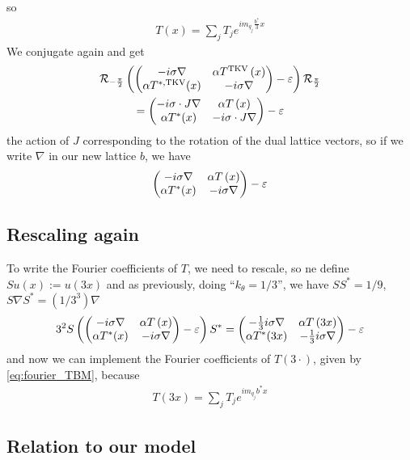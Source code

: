 \documentclass[11pt,a4paper,reqno,french,tikz]{amsart}
\newcommand{\pa}[1]{\left( #1 \right)} %
\newcommand{\na}{\nabla} %
\newcommand{\f}[2]{\frac{#1}{#2}} %
\newcommand{\mat}[1]{\begin{pmatrix} #1 \end{pmatrix}} %
\begin{document}
so
\begin{align}\label{eq:bm_our_way}
T(x) = \sum_j T_j e^{i m_{q_j} \f{b^*}{3} x}
\end{align}
We conjugate again and get
\begin{multline*}
\cR_{-\f{\pi}{2}} \pa{ \mat{-i\sigma \na & \alpha T^{\text{TKV}}\pa{x} \\ \alpha T^{*,\text{TKV}}(x) & -i\sigma \na} - \ep}\cR_{\f{\pi}{2}} \\
= \mat{-i\sigma \cdot J\na & \alpha T\pa{x} \\ \alpha T^{*}(x) & -i\sigma \cdot J\na} - \ep
\end{multline*}
the action of $J$ corresponding to the rotation of the dual lattice vectors, so if we write $\na$ in our new lattice $b$, we have
\begin{align*}
\mat{-i\sigma \na & \alpha T\pa{x} \\ \alpha T^{*}(x) & -i\sigma\na} - \ep
\end{align*}

\subsection{Rescaling again}%
\label{sub:rescaling_again}

To write the Fourier coefficients of $T$, we need to rescale, so ne define $Su(x) := u(3x)$ and as previously, doing ``$k_\theta = 1/3$'', we have $S S^* = 1/9$, $S \na S^* = \pa{1/3^3} \na$
\begin{align*}
3^2 S \pa{\mat{-i\sigma \na & \alpha T\pa{x} \\ \alpha T^{*}(x) & -i\sigma\na} - \ep} S^* = \mat{-\f{1}{3}i\sigma \na & \alpha T\pa{3x} \\ \alpha T^{*}(3x) & - \f{1}{3} i\sigma\na} - \ep
\end{align*}
and now we can implement the Fourier coefficients of $T(3\cdot)$, given by \eqref{eq:fourier_TBM}, because
\begin{align*}
T(3x) = \sum_j T_j e^{i m_{q_j} b^* x}
\end{align*}



\subsection{Relation to our model}%
\label{sub:relation_to_our_model}
\end{document}
